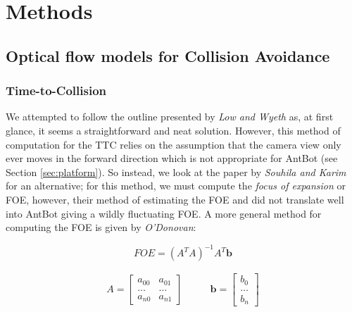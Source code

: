 \documentclass[a4paper,11pt,twoside,openright]{article}
\let\oldsection\section
\def\section{\cleardoublepage\oldsection}
\begin{document}
\section{ Methods } \label{sec:methods}
\subsection{Optical flow models for Collision Avoidance}
\subsubsection{Time-to-Collision}
We attempted to follow the outline presented by \textit{Low and Wyeth} as, at first glance, it seems
a straightforward and neat solution. However, this method of computation for the TTC relies on the
assumption that the camera view only ever moves in the forward direction \cite{Low2005} which is not appropriate
for AntBot (see Section \ref{sec:platform}). So instead, we look at the paper by \textit{Souhila and Karim}
for an alternative; for this method, we must compute the \textit{focus of expansion} or FOE, however,
their method of estimating the FOE and did not translate well into AntBot giving a wildly fluctuating FOE.
A more general method for computing the FOE is given by \textit{O'Donovan}\cite{ODonovan2005}:



\begin{equation}
  FOE = (A^TA)^{-1}A^T\mathbf{b}
\end{equation}

\begin{equation*}
  \begin{split}
 A = 
\begin{bmatrix}
  a_{00} & a_{01}\\
  \dots  & \dots \\
  a_{n0} &  a_{n1}
\end{bmatrix}
\qquad
\end{split}
\begin{split}
\mathbf{b} =
\begin{bmatrix}
  b_0 \\
  \dots \\
  b_n
\end{bmatrix}
\end{split}
\end{equation*}
\newline
\end{document}
